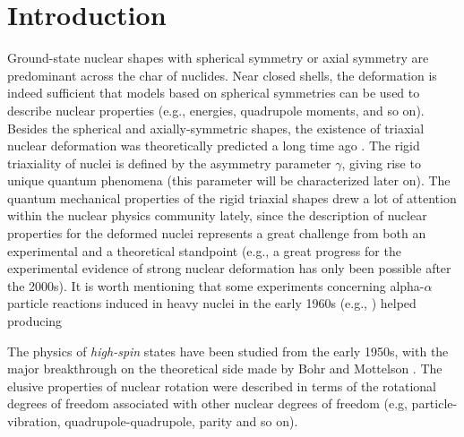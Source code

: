\chapter{Introduction}

Ground-state nuclear shapes with spherical symmetry or axial symmetry are predominant across the char of nuclides. Near closed shells, the deformation is indeed sufficient that models based on spherical symmetries can be used to describe nuclear properties (e.g., energies, quadrupole moments, and so on). Besides the spherical and axially-symmetric shapes, the existence of triaxial nuclear deformation was theoretically predicted a long time ago \cite{bohr1998nuclear}. The rigid triaxiality of nuclei is defined by the asymmetry parameter $\gamma$, giving rise to unique quantum phenomena (this parameter will be characterized later on). The quantum mechanical properties of the rigid triaxial shapes drew a lot of attention within the nuclear physics community lately, since the description of nuclear properties for the deformed nuclei represents a great challenge from both an experimental and a theoretical standpoint (e.g., a great progress for the experimental evidence of strong nuclear deformation has only been possible after the 2000s). It is worth mentioning that some experiments concerning alpha-$\alpha$ particle reactions induced in heavy nuclei in the early 1960s (e.g., \cite{morinaga1963gamma}) helped producing 

The physics of \emph{high-spin} states have been studied from the early 1950s, with the major breakthrough on the theoretical side made by Bohr and Mottelson \cite{bohr1998nuclear}. The elusive properties of nuclear rotation were described in terms of the rotational degrees of freedom associated with other nuclear degrees of freedom (e.g, particle-vibration, quadrupole-quadrupole, parity and so on). 
